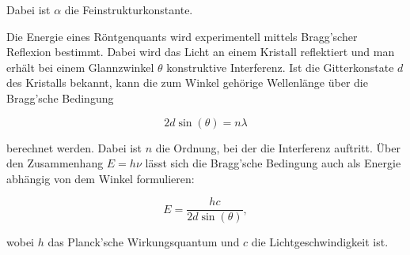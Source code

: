 Dabei ist $\alpha$ die Feinstrukturkonstante.

Die Energie eines Röntgenquants wird experimentell mittels Bragg'scher Reflexion bestimmt.
Dabei wird das Licht an einem Kristall reflektiert und man erhält bei einem Glannzwinkel $\theta$ konstruktive Interferenz.
Ist die Gitterkonstate $d$ des Kristalls bekannt, kann die zum Winkel gehörige Wellenlänge über die Bragg'sche Bedingung

\begin{equation}
    \label{eqn:bragg}
    2 d \sin (\theta) = n \lambda
\end{equation}

berechnet werden. Dabei ist $n$ die Ordnung, bei der die Interferenz auftritt.
Über den Zusammenhang $E = h \nu$ lässt sich die Bragg'sche Bedingung auch als Energie abhängig von dem Winkel formulieren:

\begin{equation}
    \label{eqn:bragg-energie}
    E = \frac{h c}{2 d \sin (\theta )},
\end{equation}

wobei $h$ das Planck'sche Wirkungsquantum und $c$ die Lichtgeschwindigkeit ist.